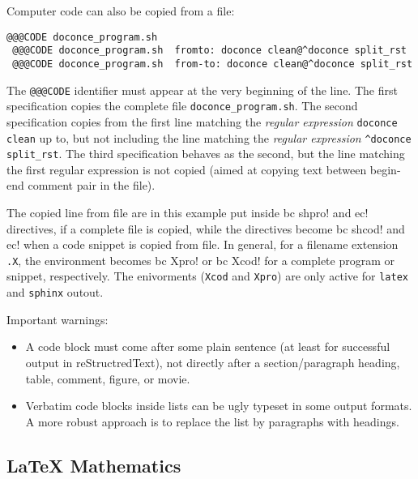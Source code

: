 \documentclass[%
oneside,                 %
final,                   %
10pt]{article}
\begin{document}
Computer code can also be copied from a file:
\begin{Verbatim}[numbers=none,fontsize=\fontsize{9pt}{9pt},baselinestretch=0.85,xleftmargin=0mm]
 @@@CODE doconce_program.sh
 @@@CODE doconce_program.sh  fromto: doconce clean@^doconce split_rst
 @@@CODE doconce_program.sh  from-to: doconce clean@^doconce split_rst
\end{Verbatim}
The \Verb!@@@CODE! identifier must appear at the very beginning of the line.
The first specification copies the complete file \Verb!doconce_program.sh!.
The second specification copies from the first line matching the \emph{regular
expression} \Verb!doconce clean! up to, but not including the line
matching the \emph{regular expression} \Verb!^doconce split_rst!.
The third specification behaves as the second, but the line matching
the first regular expression is not copied (aimed at copying
text between begin-end comment pair in the file).

The copied line from file are in this example put inside \Verb!!bc shpro!
and \Verb!!ec! directives, if a complete file is copied, while the
directives become \Verb!!bc shcod! and \Verb!!ec! when a code snippet is copied
from file. In general, for a filename extension \Verb!.X!, the environment
becomes \Verb!!bc Xpro! or \Verb!!bc Xcod! for a complete program or snippet,
respectively. The enivorments (\Verb!Xcod! and \Verb!Xpro!) are only active
for \Verb!latex! and \Verb!sphinx! outout.

Important warnings:

\begin{itemize}
 \item A code block must come after some plain sentence (at least for successful
   output in reStructredText), not directly after a section/paragraph heading,
   table, comment, figure, or movie.

 \item Verbatim code blocks inside lists can be ugly typeset in some
   output formats. A more robust approach is to replace the list by
   paragraphs with headings.
\end{itemize}

\noindent

\subsection{{\LaTeX} Mathematics}
\end{document}
